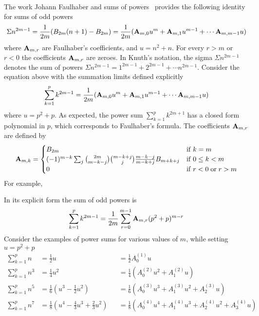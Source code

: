 The work Johann Faulhaber and sums of powers~\cite[p. 16]{knuth1993johann} provides the following identity for
sums of odd powers
\begin{align*}
    \Sigma n^{2m-1} = \frac{1}{2m} ({B}\sb{2m}(n+1) - {B}\sb{2m})
    = \frac{1}{2m} ({\mathbf{A}} \sb{m,0}u^{m} + {\mathbf{A}} \sb{m,1}u^{m-1} + \cdots {\mathbf{A}} \sb{m,m-1} u)
\end{align*}
where ${\mathbf{A}} \sb{m,r}$ are Faulhaber's coefficients, and $u=n^2 + n$.
For every $r >m$ or $r < 0$ the coefficients ${\mathbf{A}} \sb{m,r}$ are zeroes.
In Knuth's notation, the sigma $\Sigma n^{2m-1}$ denotes the sum of powers $\Sigma n^{2m-1} = 1^{2m-1} + 2^{2m-1} + \cdots n^{2m-1}$.
Consider the equation above with the summation limits defined explicitly
\begin{align*}
    \sum_{k=1}^{p} k^{2m-1} = \frac{1}{2m} ({\mathbf{A}} \sb{m,0}u^{m} + {\mathbf{A}} \sb{m,1}u^{m-1} + \cdots {\mathbf{A}} \sb{m,m-1} u)
\end{align*}
where $u=p^2+p$.
As expected, the power sum $\sum_{k=1}^{p} k^{2m+1}$ has a closed form polynomial in $p$,
which corresponds to Faulhaber's formula.
The coefficients ${\mathbf{A}} \sb{m,r}$ are defined by
\begin{align*}
    {\mathbf{A}} \sb{m,k} =
    \begin{cases}
        {B}\sb{2m} & \mathrm{if} \; k=m \\
        (-1)^{m-k} \sum_{j} \binom{2m}{m-k-j} \binom{m-k+j}{j} \frac{m-k-j}{m-k+j} {B}\sb{m+k+j} & \mathrm{if} \; 0 \leq k<m \\
        0 & \mathrm{if} \; r<0 \; \mathrm{or} \; r>m
    \end{cases}
\end{align*}
For example,

In its explicit form the sum of odd powers is
\begin{align*}
    \sum_{k=1}^{p} k^{2m-1} = \frac{1}{2m} \sum_{r=0}^{m-1} {\mathbf{A}} \sb{m,r} (p^2+p)^{m-r}
\end{align*}
Consider the examples of power sums for various values of $m$, while setting $u=p^2+p$
\begin{align*}
    \sum_{k=1}^{p} n   &= \frac{1}{2} u &&= \frac{1}{2} A_0^{(1)} u \\
    \sum_{k=1}^{p} n^3 &= \frac{1}{4} u^2 &&= \frac{1}{4} \left( A_0^{(2)} u^2 + A_1^{(2)} u \right)  \\
    \sum_{k=1}^{p} n^5 &= \frac{1}{6} \left( u^3 - \frac{1}{2} u^2 \right) &&= \frac{1}{6} \left( A_0^{(3)} u^3 + A_1^{(3)} u^2 + A_2^{(3)} u \right) \\
    \sum_{k=1}^{p} n^7 &= \frac{1}{8} \left( u^4 - \frac{4}{3} u^3 + \frac{2}{3} u^2 \right) &&= \frac{1}{8} \left( A_0^{(4)} u^4 + A_1^{(4)} u^3 + A_2^{(4)} u^2 + A_3^{(4)} u \right)
\end{align*}
